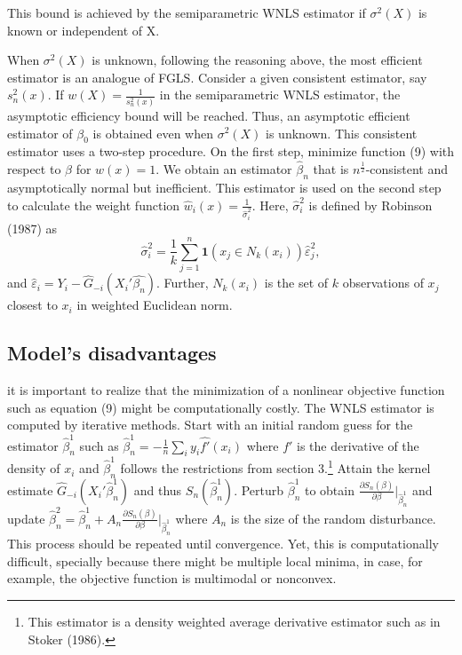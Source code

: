 \documentclass[a4paper]{article}
\begin{document}
This bound is achieved by the semiparametric WNLS estimator if $\sigma^2(X)$ is known or independent of X. 

When $\sigma^2(X)$ is unknown, following the reasoning above, the most efficient estimator is an analogue of FGLS.  Consider a given consistent estimator, say $s_{n}^{2}(x)$. If $w(X) = \frac{1}{s_{n}^{2}(x)}$ in the semiparametric WNLS estimator, the asymptotic efficiency bound will be reached. Thus, an asymptotic efficient estimator of $\beta_0$ is obtained even when $\sigma^2(X)$ is unknown. This consistent estimator uses a two-step procedure. On the first step, minimize function (9) with respect to $\beta$ for $w(x) = 1$. We obtain an estimator $\hat{\beta}_n$ that is $n^{\frac{1}{2}}$-consistent and asymptotically normal but inefficient. This estimator is used on the second step to calculate the weight function $\hat{w}_i(x) = \frac{1}{\hat{\sigma}_{i}^{2}}$. Here, $\hat{\sigma}_{i}^{2}$ is defined by Robinson (1987) as 
\[\hat{\sigma}_{i}^{2} = \frac{1}{k}\sum_{j=1}^{n} \mathbf{1}{(x_j \in N_k(x_i))}\hat{\varepsilon}_{j}^{2} ,\]
and $\hat{\varepsilon}_i = Y_i - \hat{G}_{-i}(X_i'\hat{\beta_n})$. Further, $N_k(x_i)$ is the set of $k$ observations of $x_j$ closest to $x_i$ in weighted Euclidean norm.



\subsection{Model's disadvantages} %
\label{sub:Model's disadvantages}


it is important to realize that the minimization of a nonlinear objective function such as equation (9) might be computationally costly. The WNLS estimator is computed by iterative methods. Start with an initial random guess for the estimator $\hat{\beta}_n^{1}$ such as $\hat{\beta}_n^{1} = - \frac{1}{n}\sum_i y_i\hat{f'}(x_i)$ where $f'$ is the derivative of the density of $x_i$ and $\hat{\beta}_n^{1}$ follows the restrictions from section 3.\footnote{This estimator is a density weighted average derivative estimator such as in Stoker (1986).} Attain the kernel estimate $\hat{G}_{-i}(X_i'\hat{\beta}_n^{1})$ and thus $S_n(\hat{\beta}_n^{1})$. Perturb $\hat{\beta}_n^{1}$ to obtain $\frac{\partial S_n(\beta)}{\partial\beta} |_{\hat{\beta}_n^{1}}$ and update $\hat{\beta}_n^{2} = \hat{\beta}_n^{1} + A_n  \frac{ \partial S_n(\beta)}{\partial\beta}|_{\hat{\beta}_n^{1}}$ where $A_n$ is the size of the random disturbance. This process should be repeated until convergence. Yet, this is computationally difficult, specially because there might be multiple local minima, in case, for example, the objective function is multimodal or nonconvex. 
\end{document}
